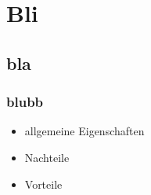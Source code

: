 \documentclass[a4paper, 12pt]{article}
\begin{document}



\section{Bli}


\subsection{bla}

\subsubsection*{blubb}

\begin{itemize}
  \item allgemeine Eigenschaften
\end{itemize}
\begin{itemize}
  \renewcommand{\labelitemi}{\(-\)}%
  \item Nachteile
\end{itemize}
\begin{itemize}
  \renewcommand{\labelitemi}{+}%
  \item Vorteile
\end{itemize}
\end{document}
